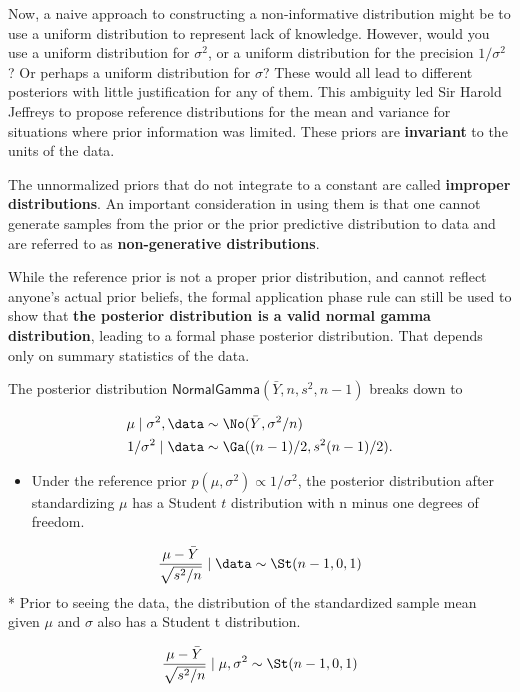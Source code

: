 \documentclass[]{book}
\providecommand{\tightlist}{%
  \setlength{\itemsep}{0pt}\setlength{\parskip}{0pt}}
\theoremstyle{definition}
\theoremstyle{definition}
\theoremstyle{definition}
\theoremstyle{remark}
\begin{document}
Now, a naive approach to constructing a non-informative distribution
might be to use a uniform distribution to represent lack of knowledge.
However, would you use a uniform distribution for \(\sigma^2\), or a
uniform distribution for the precision \(1/\sigma^2\)? Or perhaps a
uniform distribution for \(\sigma\)? These would all lead to different
posteriors with little justification for any of them. This ambiguity led
Sir Harold Jeffreys to propose reference distributions for the mean and
variance for situations where prior information was limited. These
priors are \textbf{invariant} to the units of the data.

The unnormalized priors that do not integrate to a constant are called
\textbf{improper distributions}. An important consideration in using
them is that one cannot generate samples from the prior or the prior
predictive distribution to data and are referred to as
\textbf{non-generative distributions}.

While the reference prior is not a proper prior distribution, and cannot
reflect anyone's actual prior beliefs, the formal application phase rule
can still be used to show that \textbf{the posterior distribution is a
valid normal gamma distribution}, leading to a formal phase posterior
distribution. That depends only on summary statistics of the data.

The posterior distribution
\(\textsf{NormalGamma}(\bar{Y}, n, s^2, n-1)\) breaks down to

\[\begin{aligned}
\mu \mid \sigma^2, \data & \sim \No(\bar{Y}, \sigma^2/n) \\
1/\sigma^2  \mid \data & \sim \Ga((n-1)/2, s^2(n - 1)/2).
\end{aligned}\]

\begin{itemize}
\tightlist
\item
  Under the reference prior \(p(\mu, \sigma^2) \propto 1/\sigma^2\), the
  posterior distribution after standardizing \(\mu\) has a Student \(t\)
  distribution with n minus one degrees of freedom.
\end{itemize}

\[\frac{\mu - \bar{Y}}{\sqrt{s^2/n}} \mid \data \sim  \St(n-1, 0, 1)\] *
Prior to seeing the data, the distribution of the standardized sample
mean given \(\mu\) and \(\sigma\) also has a Student t distribution.

\[\frac{\mu - \bar{Y}}{\sqrt{s^2/n}} \mid \mu, \sigma^2 \sim  \St(n-1, 0, 1) \]
\end{document}
